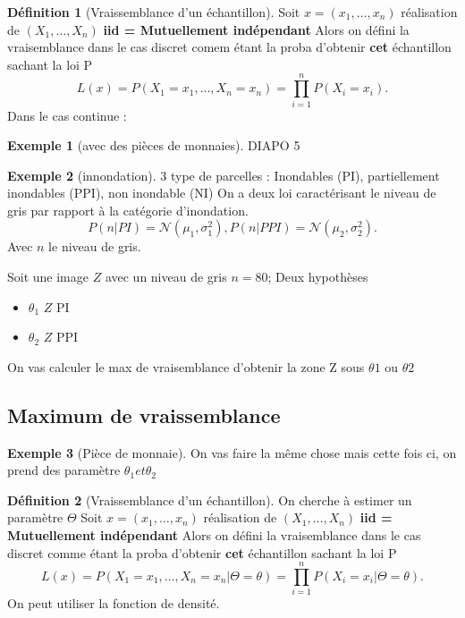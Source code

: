 \documentclass{article}
\theoremstyle{plain}%
\theoremstyle{definition}
\newtheorem{defn}{Définition}[section]
\newtheorem{exmp}{Exemple}[section]
\theoremstyle{remark}
\begin{document}
\begin{defn}[Vraissemblance d'un échantillon]
    Soit $ x = (x_1, \dots, x_n) $ réalisation de $ (X_1, \dots, X_n) $  \textbf{iid = Mutuellement indépendant}
    Alors on défini la vraisemblance dans le cas discret comem étant la proba d'obtenir \textbf{cet} échantillon sachant la loi P
    \[
        L(x) = P(X_1=x_1, \dots, X_n= x_n ) = \prod_{i=1}^{n}P(X_i = x_i)
    .\]
    Dans le cas continue :
\end{defn}
\begin{exmp}[avec des pièces de monnaies]
    DIAPO 5
\end{exmp}
\begin{exmp}[innondation]
    3 type de parcelles : Inondables (PI), partiellement inondables (PPI), non inondable (NI)
    On a deux loi caractérisant le niveau de gris par rapport à la catégorie d'inondation.
    \[
        P(n | PI) = \mathcal{N}(\mu _1, \sigma ^2_1), P(n|PPI) = \mathcal{N}(\mu _2, \sigma ^2_2)
    .\]
    Avec $ n $ le niveau de gris.

    Soit une image $ Z $ avec un niveau de gris $ n=80 $; Deux hypothèses \begin{itemize}
        \item $ \theta _1 $ $ Z $ PI
        \item $ \theta _2 $ $ Z $ PPI
    \end{itemize}
    On vas calculer le max de vraisemblance d'obtenir la zone Z sous $ \theta 1 $ ou $ \theta 2 $  
    
\end{exmp}

\subsection{Maximum de vraissemblance}
\begin{exmp}[Pièce de monnaie]
    On vas faire la même chose mais cette fois ci, on prend des paramètre $ \theta _1 et \theta _2 $
\end{exmp}

\begin{defn}[Vraissemblance d'un échantillon]
    On cherche à estimer un paramètre $ \Theta  $ 
    Soit $ x = (x_1, \dots, x_n) $ réalisation de $ (X_1, \dots, X_n) $  \textbf{iid = Mutuellement indépendant}
    Alors on défini la vraisemblance dans le cas discret comme étant la proba d'obtenir \textbf{cet} échantillon sachant la loi P
    \[
        L(x) = P(X_1=x_1, \dots, X_n= x_n | \Theta = \theta ) = \prod_{i=1}^{n}P(X_i = x_i | \Theta = \theta )
    .\]
    On peut utiliser la fonction de densité.
\end{defn}
\end{document}
